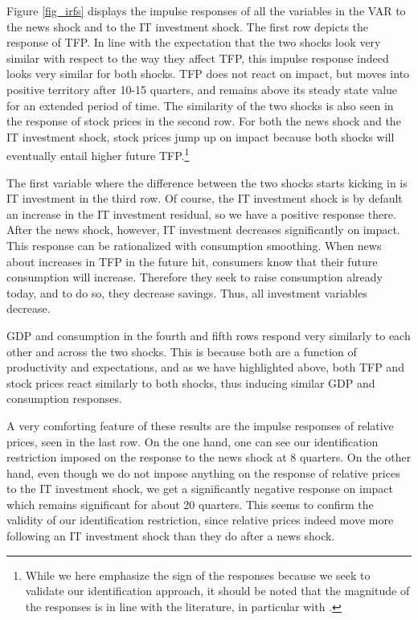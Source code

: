 \documentclass[11pt]{article}
\renewcommand{\[}{\begin{equation}}
\renewcommand{\]}{\end{equation}}
\begin{document}
Figure \ref{fig_irfs} displays the impulse responses of all the variables in the VAR to the news shock and to the IT investment shock. The first row depicts the response of TFP. In line with the expectation that the two shocks look very similar with respect to the way they affect TFP, this impulse response indeed looks very similar for both shocks. TFP does not react on impact, but moves into positive territory after 10-15 quarters, and remains above its steady state value for an extended period of time. The similarity of the two shocks is also seen in the response of stock prices in the second row. For both the news shock and the IT investment shock, stock prices jump up on impact because both shocks will eventually entail higher future TFP.\footnote{While we here emphasize the sign of the responses because we seek to validate our identification approach, it should be noted that the magnitude of the responses is in line with the literature, in particular with \cite{barsky_sims2011}.} 

The first variable where the difference between the two shocks starts kicking in is IT investment in the third row. Of course, the IT investment shock is by default an increase in the IT investment residual, so we have a positive response there. After the news shock, however, IT investment decreases significantly on impact. This response can be rationalized with consumption smoothing. When news about increases in TFP in the future hit, consumers know that their future consumption will increase. Therefore they seek to raise consumption already today, and to do so, they decrease savings. Thus, all investment variables decrease. 

GDP and consumption in the fourth and fifth rows respond very similarly to each other and across the two shocks. This is because both are a function of productivity and expectations, and as we have highlighted above, both TFP and stock prices react similarly to both shocks, thus inducing similar GDP and consumption responses.

A very comforting feature of these results are the impulse responses of relative prices, seen in the last row. On the one hand, one can see our identification restriction imposed on the response to the news shock at 8 quarters. On the other hand, even though we do not impose anything on the response of relative prices to the IT investment shock, we get a significantly negative response on impact which remains significant for about 20 quarters. This seems to confirm the validity of our identification restriction, since relative prices indeed move more following an IT investment shock than they do after a news shock. 
\end{document}
